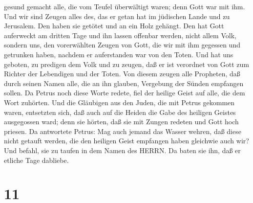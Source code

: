 gesund gemacht alle, die vom Teufel überwältigt waren; denn Gott war mit
ihm.  Und wir sind Zeugen alles des, das er getan hat im
jüdischen Lande und zu Jerusalem. Den haben sie getötet und an ein Holz
gehängt.  Den hat Gott auferweckt am dritten Tage und ihn
lassen offenbar werden,  nicht allem Volk, sondern uns, den
vorerwählten Zeugen von Gott, die wir mit ihm gegessen und getrunken
haben, nachdem er auferstanden war von den Toten.  Und hat
uns geboten, zu predigen dem Volk und zu zeugen, daß er ist verordnet
von Gott zum Richter der Lebendigen und der Toten.  Von
diesem zeugen alle Propheten, daß durch seinen Namen alle, die an ihn
glauben, Vergebung der Sünden empfangen sollen.  Da Petrus
noch diese Worte redete, fiel der heilige Geist auf alle, die dem Wort
zuhörten.  Und die Gläubigen aus den Juden, die mit Petrus
gekommen waren, entsetzten sich, daß auch auf die Heiden die Gabe des
heiligen Geistes ausgegossen ward;  denn sie hörten, daß
sie mit Zungen redeten und Gott hoch priesen. Da antwortete Petrus:
 Mag auch jemand das Wasser wehren, daß diese nicht getauft
werden, die den heiligen Geist empfangen haben gleichwie auch wir?
 Und befahl, sie zu taufen in dem Namen des HERRN. Da baten
sie ihn, daß er etliche Tage dabliebe.

\hypertarget{section-10}{%
\section{11}\label{section-10}}

